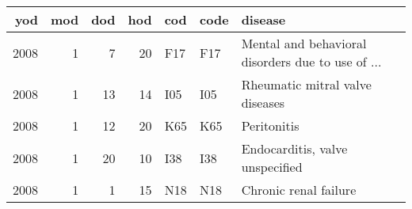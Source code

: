 \begin{tabular}{rrrrlll}
\toprule
  yod &  mod &  dod &  hod &  cod & code &                                            disease \\
\midrule
 2008 &    1 &    7 &   20 &  F17 &  F17 &  Mental and behavioral disorders due to use of ... \\
 2008 &    1 &   13 &   14 &  I05 &  I05 &                    Rheumatic mitral valve diseases \\
 2008 &    1 &   12 &   20 &  K65 &  K65 &                                        Peritonitis \\
 2008 &    1 &   20 &   10 &  I38 &  I38 &                    Endocarditis, valve unspecified \\
 2008 &    1 &    1 &   15 &  N18 &  N18 &                              Chronic renal failure \\
\bottomrule
\end{tabular}

